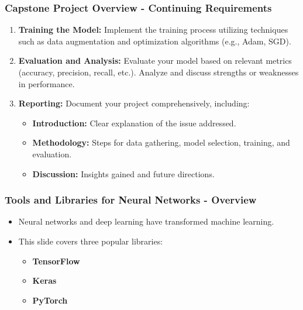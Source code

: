 \documentclass[aspectratio=169]{beamer}
\begin{document}
\begin{frame}[fragile]
    \frametitle{Capstone Project Overview - Continuing Requirements}
    \begin{enumerate}[resume]
        \item \textbf{Training the Model:} 
            Implement the training process utilizing techniques such as data augmentation and optimization algorithms (e.g., Adam, SGD).

        \item \textbf{Evaluation and Analysis:} 
            Evaluate your model based on relevant metrics (accuracy, precision, recall, etc.). 
            Analyze and discuss strengths or weaknesses in performance.

        \item \textbf{Reporting:} 
            Document your project comprehensively, including:
            \begin{itemize}
                \item \textbf{Introduction:} Clear explanation of the issue addressed.
                \item \textbf{Methodology:} Steps for data gathering, model selection, training, and evaluation.
                \item \textbf{Discussion:} Insights gained and future directions.
            \end{itemize}
    \end{enumerate}
\end{frame}

\begin{frame}[fragile]
    \frametitle{Tools and Libraries for Neural Networks - Overview}
    \begin{itemize}
        \item Neural networks and deep learning have transformed machine learning.
        \item This slide covers three popular libraries:
        \begin{itemize}
            \item \textbf{TensorFlow}
            \item \textbf{Keras}
            \item \textbf{PyTorch}
        \end{itemize}
    \end{itemize}
\end{frame}
\end{document}
